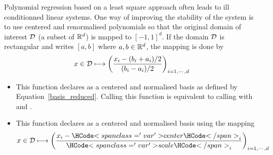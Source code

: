 Polynomial regression based on a least square approach often leads to ill
conditionned linear systems. One way of improving the stability of the system is to
use centered and renormalised polynomials so that the original domain of interest
${\mathcal D}$ (a subset of ${\mathbb R}^d$) is mapped to $[-1,1]^d$. If the domain ${\mathcal D}$ is
rectangular and writes $[a, b]$ where $a,b \in {\mathbb R}^d$, the mapping is done by 
\begin{equation}
  \label{basis_reduced}
  x \in {\mathcal D} \longmapsto \left(\frac{x_i - (b_i+a_i)/2}{(b_i - a_i)/2}\right)_{i=1,\cdots,d}
\end{equation}
\begin{itemize}
\item {}
  \sshortdescribe This function declares  as a centered and normalised basis
  as defined by Equation~\ref{basis_reduced}. Calling this function is equivalent to
  calling  with  and
  .
\item {}
  \sshortdescribe This function declares  as a centered and normalised basis
  using the mapping
  \begin{equation*}
    x \in \cD \longmapsto \left(\frac{x_i - \var{center}_i }{\var{scale}_i}\right)_{i=1,\cdots,d}
  \end{equation*}
\end{itemize}


